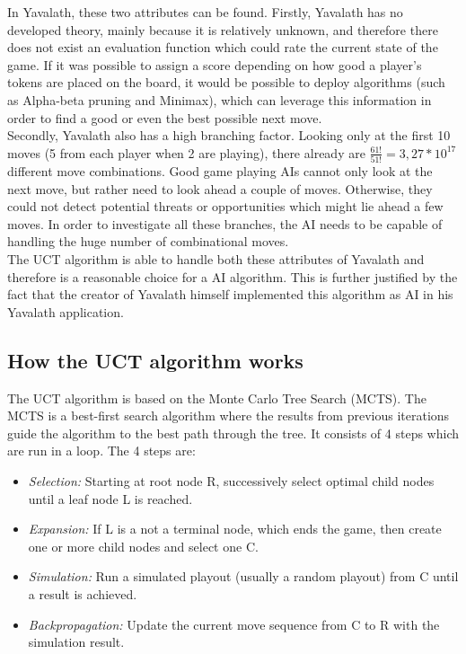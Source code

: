 \documentclass[english]{report}
\begin{document}
In Yavalath, these two attributes can be found. Firstly, Yavalath has no
developed theory, mainly because it is relatively unknown, and therefore there
does not exist an evaluation function which could rate the current state of the
game. If it was possible to assign a score depending on how good a player's
tokens are placed on the board, it would be possible to deploy algorithms (such
as Alpha-beta pruning and Minimax), which can leverage this information in order
to find a good or even the best possible next move.\\

Secondly, Yavalath also has a high branching factor. Looking only at the first
10 moves (5 from each player when 2 are playing), there already are
\(\frac{61!}{51!}=3,27*10^17\) different move combinations. Good game playing
AIs cannot only look at the next move, but rather need to look ahead a couple of
moves. Otherwise, they could not detect potential threats or opportunities which
might lie ahead a few moves. In order to investigate all these branches, the AI
needs to be capable of handling the huge number of combinational moves.\\

The UCT algorithm is able to handle both these attributes of Yavalath and
therefore is a reasonable choice for a AI algorithm. This is further justified
by the fact that the creator of Yavalath himself implemented this algorithm as
AI in his Yavalath application.\cite{yvalath}


\subsection{How the UCT algorithm works}

The UCT algorithm is based on the Monte Carlo Tree Search (MCTS). The MCTS is a
best-first search algorithm where the results from previous iterations guide the
algorithm to the best path through the tree. It consists of 4 steps which are
run in a loop. The 4 steps\cite{mcts}\cite{wiki:mcts} are:
\begin{itemize}
	\item \textit{Selection:} Starting at root node R, successively select optimal child nodes until a leaf node L is reached.
	\item \textit{Expansion:}  If L is a not a terminal node, which ends the game, then create one or more child nodes and select one C.
	\item \textit{Simulation:}  Run a simulated playout (usually a random playout) from C until a result is achieved.
	\item \textit{Backpropagation:}  Update the current move sequence from C to R with the simulation result.
\end{itemize}
\end{document}
